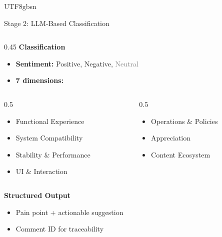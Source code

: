 \documentclass[11pt,aspectratio=169]{beamer}
\begin{document}
\begin{CJK*}{UTF8}{gbsn}
\begin{frame}{Stage 2: LLM-Based Classification}
\begin{columns}[T]
\begin{column}{0.45\textwidth}
      \vspace{0.12cm}
      \textbf{Classification}
      \begin{itemize}
        \setlength\itemsep{0pt}
        \item \textbf{Sentiment:} \textcolor{green!60!black}{Positive},
              \textcolor{red!60!black}{Negative}, \textcolor{gray}{Neutral}
        \item \textbf{7 dimensions:}
      \end{itemize}
      \vspace{-0.22cm}
      \begin{columns}[T,onlytextwidth]
        \begin{column}{0.5\textwidth}
          \begin{itemize}\tiny
            \setlength\itemsep{0pt}
            \item Functional Experience
            \item System Compatibility
            \item Stability \& Performance
            \item UI \& Interaction
          \end{itemize}
        \end{column}
        \begin{column}{0.5\textwidth}
          \begin{itemize}\tiny
            \setlength\itemsep{0pt}
            \item Operations \& Policies
            \item Appreciation
            \item Content Ecosystem
          \end{itemize}
        \end{column}
      \end{columns}

      \vspace{0.08cm}
      \textbf{Structured Output}
      \begin{itemize}
        \setlength\itemsep{0pt}
        \item Pain point + actionable suggestion
        \item Comment ID for traceability
      \end{itemize}


\end{column}
\end{columns}
\end{frame}
\end{CJK*}
\end{document}
